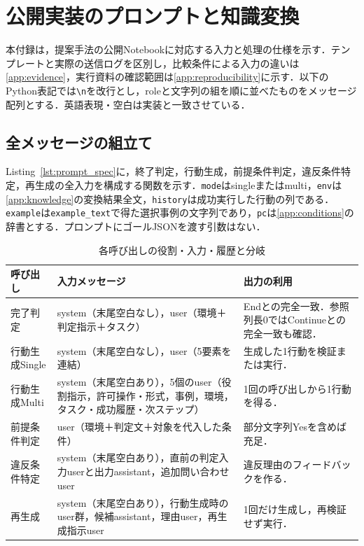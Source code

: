 \appendix
\section{公開実装のプロンプトと知識変換}\label{app:implementation}

本付録は，提案手法の公開Notebookに対応する入力と処理の仕様を示す．テンプレートと実際の送信ログを区別し，比較条件による入力の違いは\ref{app:evidence}，実行資料の確認範囲は\ref{app:reproducibility}に示す．以下のPython表記では\texttt{\textbackslash n}を改行とし，roleと文字列の組を順に並べたものをメッセージ配列とする．英語表現・空白は実装と一致させている．

\subsection{全メッセージの組立て}\label{app:prompts}
Listing~\ref{lst:prompt_spec}に，終了判定，行動生成，前提条件判定，違反条件特定，再生成の全入力を構成する関数を示す．\texttt{mode}はsingleまたはmulti，\texttt{env}は\ref{app:knowledge}の変換結果全文，\texttt{history}は成功実行した行動の列である．\texttt{example}は\texttt{example\_text}で得た選択事例の文字列であり，\texttt{pc}は\ref{app:conditions}の辞書とする．プロンプトにゴールJSONを渡す引数はない．

\begin{table}[tb]
\caption{各呼び出しの役割・入力・履歴と分岐}\label{tab:prompt_calls}
\centering\small
\begin{tabular}{p{}p{}p{}}
\hline
呼び出し & 入力メッセージ & 出力の利用 \\
\hline
完了判定 & system（末尾空白なし），user（環境＋判定指示＋タスク） & Endとの完全一致．参照列長0ではContinueとの完全一致も確認．\\
行動生成Single & system（末尾空白なし），user（5要素を連結） & 生成した1行動を検証または実行．\\
行動生成Multi & system（末尾空白あり），5個のuser（役割指示，許可操作・形式，事例，環境，タスク・成功履歴・次ステップ） & 1回の呼び出しから1行動を得る．\\
前提条件判定 & user（環境＋判定文＋対象を代入した条件） & 部分文字列Yesを含めば充足．\\
違反条件特定 & system（末尾空白あり），直前の判定入力userと出力assistant，追加問い合わせuser & 違反理由のフィードバックを作る．\\
再生成 & system（末尾空白あり），行動生成時のuser群，候補assistant，理由user，再生成指示user & 1回だけ生成し，再検証せず実行．\\
\hline
\end{tabular}
\end{table}

